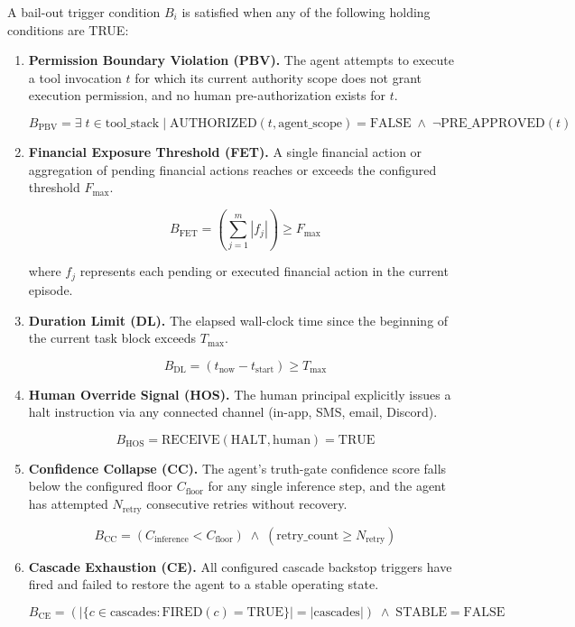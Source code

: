 A bail-out trigger condition $B_i$ is satisfied when any of the following holding conditions are TRUE:

\bigskip

\begin{enumerate}
  \item \textbf{Permission Boundary Violation (PBV).} The agent attempts to execute a tool invocation $t$ for which its current authority scope does not grant execution permission, and no human pre-authorization exists for $t$.

  \[
  B_{\text{PBV}} = \exists \; t \in \text{tool\_stack} \;|\; \text{AUTHORIZED}(t, \text{agent\_scope}) = \text{FALSE} \;\land\; \neg \text{PRE\_APPROVED}(t)
  \]

  \item \textbf{Financial Exposure Threshold (FET).} A single financial action or aggregation of pending financial actions reaches or exceeds the configured threshold $F_{\text{max}}$.

  \[
  B_{\text{FET}} = \left( \sum_{j=1}^{m} |f_j| \right) \geq F_{\text{max}}
  \]

  where $f_j$ represents each pending or executed financial action in the current episode.

  \item \textbf{Duration Limit (DL).} The elapsed wall-clock time since the beginning of the current task block exceeds $T_{\text{max}}$.

  \[
  B_{\text{DL}} = \left( t_{\text{now}} - t_{\text{start}} \right) \geq T_{\text{max}}
  \]

  \item \textbf{Human Override Signal (HOS).} The human principal explicitly issues a halt instruction via any connected channel (in-app, SMS, email, Discord).

  \[
  B_{\text{HOS}} = \text{RECEIVE}(\text{HALT}, \text{human}) = \text{TRUE}
  \]

  \item \textbf{Confidence Collapse (CC).} The agent's truth-gate confidence score falls below the configured floor $C_{\text{floor}}$ for any single inference step, and the agent has attempted $N_{\text{retry}}$ consecutive retries without recovery.

  \[
  B_{\text{CC}} = \left( C_{\text{inference}} < C_{\text{floor}} \right) \;\land\; \left( \text{retry\_count} \geq N_{\text{retry}} \right)
  \]

  \item \textbf{Cascade Exhaustion (CE).} All configured cascade backstop triggers have fired and failed to restore the agent to a stable operating state.

  \[
  B_{\text{CE}} = \left( |\{c \in \text{cascades} : \text{FIRED}(c) = \text{TRUE}\}| = |\text{cascades}| \right) \;\land\; \text{STABLE} = \text{FALSE}
  \]
\end{enumerate}

